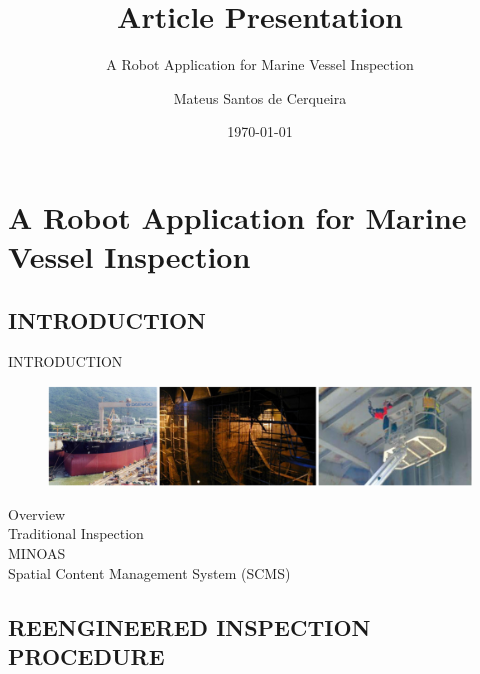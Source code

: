 \documentclass{beamer}
\title{Article Presentation}
\subtitle{A Robot Application for Marine Vessel Inspection}
\author{Mateus Santos de Cerqueira}
\institute{SENAI}
\date{\today}
\begin{document}
    \begin{frame}
        \titlepage
    \end{frame}
    
    \section{A Robot Application for Marine Vessel Inspection}

        \subsection{INTRODUCTION}

            \begin{frame}{INTRODUCTION}
                \begin{figure}[htb]
                    \centering
                    \includegraphics[scale=0.16]{figuras/traditional_inspection.png}                   
                    \label{}
                \end{figure}
                Overview \\
                Traditional Inspection \\
                MINOAS \\
                Spatial Content Management System (SCMS)                           
            \end{frame}
            
        \subsection{REENGINEERED INSPECTION PROCEDURE}
\end{document}
